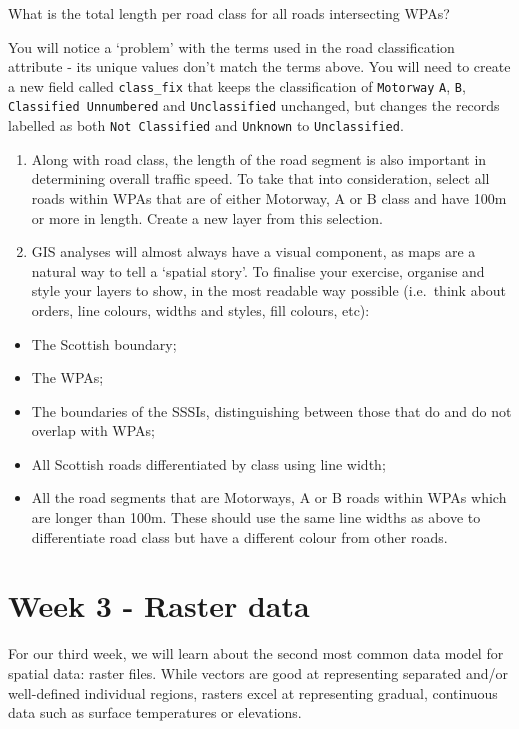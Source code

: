\documentclass[
  letterpaper,
  DIV=11,
  numbers=noendperiod]{scrreprt}
\providecommand{\tightlist}{%
  \setlength{\itemsep}{0pt}\setlength{\parskip}{0pt}}\usepackage{longtable,booktabs,array}
\begin{document}
What is the total length per road class for all roads intersecting WPAs?

You will notice a `problem' with the terms used in the road
classification attribute - its unique values don't match the terms
above. You will need to create a new field called \texttt{class\_fix}
that keeps the classification of \texttt{Motorway} \texttt{A},
\texttt{B}, \texttt{Classified\ Unnumbered} and \texttt{Unclassified}
unchanged, but changes the records labelled as both
\texttt{Not\ Classified} and \texttt{Unknown} to \texttt{Unclassified}.

\begin{enumerate}
\def\labelenumi{\alph{enumi})}
\setcounter{enumi}{3}
\item
  Along with road class, the length of the road segment is also
  important in determining overall traffic speed. To take that into
  consideration, select all roads within WPAs that are of either
  Motorway, A or B class and have 100m or more in length. Create a new
  layer from this selection.
\item
  GIS analyses will almost always have a visual component, as maps are a
  natural way to tell a `spatial story'. To finalise your exercise,
  organise and style your layers to show, in the most readable way
  possible (i.e.~think about orders, line colours, widths and styles,
  fill colours, etc):
\end{enumerate}

\begin{itemize}
\tightlist
\item
  The Scottish boundary;
\item
  The WPAs;
\item
  The boundaries of the SSSIs, distinguishing between those that do and
  do not overlap with WPAs;
\item
  All Scottish roads differentiated by class using line width;
\item
  All the road segments that are Motorways, A or B roads within WPAs
  which are longer than 100m. These should use the same line widths as
  above to differentiate road class but have a different colour from
  other roads.
\end{itemize}

\part{Week 3 - Raster data}

For our third week, we will learn about the second most common data
model for spatial data: raster files. While vectors are good at
representing separated and/or well-defined individual regions, rasters
excel at representing gradual, continuous data such as surface
temperatures or elevations.
\end{document}
